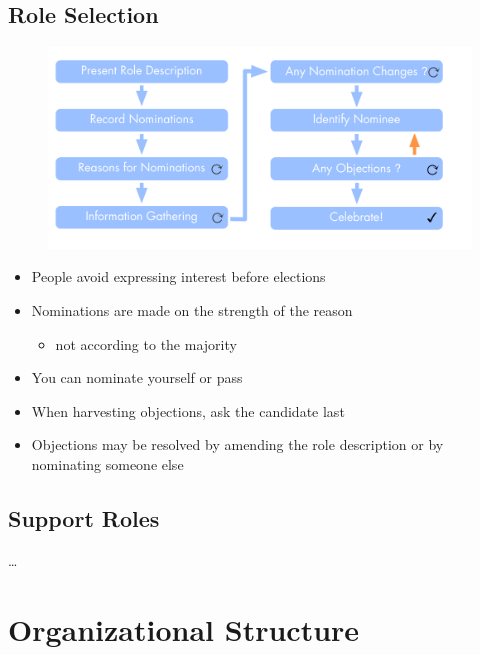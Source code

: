 \section{Role Selection}
\label{roleselection}

\begin{figure}[htbp]
\centering
\includegraphics[keepaspectratio,width=\textwidth,height=0.75\textheight]{img/people-and-roles/selection.png}
\end{figure}

\begin{itemize}
\item People avoid expressing interest before elections

\item Nominations are made on the strength of the reason

\begin{itemize}
\item not according to the majority

\end{itemize}

\item You can nominate yourself or pass

\item When harvesting objections, ask the candidate last

\item Objections may be resolved by amending the role description or by nominating someone else

\end{itemize}

\section{Support Roles}
\label{supportroles}

{\ldots}

\chapter{Organizational Structure}
\label{organizationalstructure}

